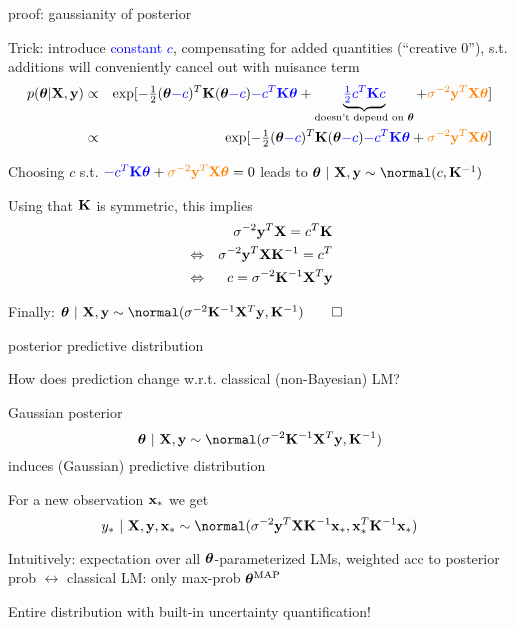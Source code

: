 \documentclass[11pt,compress,t,notes=noshow, xcolor=table]{beamer}
\begin{document}
\begin{framei}[fs=small]{proof: gaussianity of posterior}
\item Trick: introduce \textcolor{blue}{constant $c$}, compensating for added quantities  (``creative 0''), s.t. additions will conveniently cancel out with nuisance term
\begin{eqnarray*}
	p(\bm{\theta} | \mathbf{X}, \mathbf{y}) &\propto&  \exp[-\tfrac{1}{2}(\bm{\theta} \textcolor{blue}{- c})^T\mathbf{K}  (\bm{\theta} \textcolor{blue}{- c}) \textcolor{blue}{- c^T \mathbf{K} \bm{\theta}} + \underbrace{\textcolor{blue}{\tfrac{1}{2}c^T\mathbf{K} c}}_{\text{doesn't depend on } \bm{\theta}} + \textcolor{orange}{\sigma^{-2} \mathbf{y}^T \mathbf{X} \bm{\theta}} ] \\
	&\propto& \exp [-\tfrac{1}{2}(\bm{\theta} \textcolor{blue}{- c})^T\mathbf{K}  (\bm{\theta} \textcolor{blue}{- c}) \textcolor{blue}{- c^T \mathbf{K} \bm{\theta}} + \textcolor{orange}{\sigma^{-2} \mathbf{y}^T \mathbf{X} \bm{\theta}} ]
\end{eqnarray*}
\item Choosing $c$  s.t. 
$\textcolor{blue}{- c^T \mathbf{K} \bm{\theta}} + \textcolor{orange}{\sigma^{-2} \mathbf{y}^T \mathbf{X} \bm{\theta}} = 0$ 
leads to 
$\thetav ~|~ \Xmat, \yv \sim \normal(c, \Kinv)$
\item Using that $\mathbf{K}$ is symmetric, this implies 
\begin{eqnarray*}
&& \sigma^{-2} \mathbf{y}^T \mathbf{X} = c^T\mathbf{K} \\
&\Leftrightarrow & \sigma^{-2} \mathbf{y}^T \mathbf{X} \mathbf{K}^{-1} = c^T \\
&\Leftrightarrow& c = \sigma^{-2} \mathbf{K}^{-1} \mathbf{X}^T \mathbf{y}
\end{eqnarray*}
\item Finally: $\thetav ~|~ \Xmat, \yv \sim  \normal(\sigma^{-2}\Kinv\Xmat^T\yv, \Kinv) \qed$
\end{framei}

\begin{framei}[sep=L]{posterior predictive distribution}
\item How does prediction change w.r.t. classical (non-Bayesian) LM?
\item Gaussian posterior   
$$
\thetav ~|~ \Xmat, \yv \sim  \normal(\sigma^{-2}\Kinv\Xmat^T\yv, \Kinv)
$$
induces (Gaussian) predictive distribution
\item For a new observation $\mathbf{x}_\ast$ we get
$$
y_* ~|~ \Xmat, \yv, \xs \sim \normal(\sigma^{-2}\yv^T \Xmat \Kinv\xs, \xs^T\Kinv\xs)
$$
\item Intuitively: expectation over all $\bm{\theta}$-parameterized LMs, weighted acc to posterior prob $\leftrightarrow$ classical LM: only max-prob $\bm{\theta}^{\text{MAP}}$
\item Entire distribution with built-in uncertainty quantification!
\end{framei}
\end{document}
